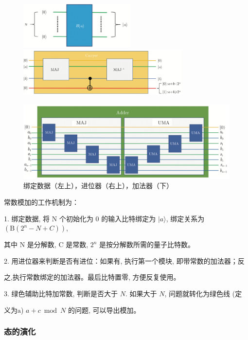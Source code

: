 \documentclass[12pt,hyperref,a4paper,UTF8]{ctexart}
\begin{document}
\begin{figure}[!htbp]
	\begin{minipage}{0.4\linewidth}
		\centering
		\includegraphics[width=2.3in]{figures/绑定数据.png}
	\end{minipage}
	\begin{minipage}{0.6\linewidth}
		\centering
		\includegraphics[width=3.4in]{figures/进位器.png}
	\end{minipage}
\end{figure}
\vskip -18pt
\begin{figure}[!htbp]     
    \centering     
    \includegraphics[width =0.6 \textwidth]{figures/加法器.png}     
    \caption{绑定数据（左上），进位器（右上），加法器（下）}
\end{figure}
\newpage

\noindent
常数模加的工作机制为：

\vskip 3pt
1. 绑定数据, 将 $\mathrm{N}$ 个初始化为 0 的输入比特绑定为 $|a\rangle$, 绑定关系为 $\left(\mathrm{B}\left(2^n-N+C\right)\right)$, 

\quad 其中 $\mathrm{N}$ 是分解数, $\mathrm{C}$ 是常数, $2^n$ 是按分解数所需的量子比特数。

\vskip 3pt
2. 用进位器来判断是否有进位：如果有, 执行第一个模块, 即带常数的加法器；反

\quad 之,执行常数绑定的加法器。最后比特置零, 方便反复使用。

\vskip 3pt
3. 绿色辅助比特加常数, 判断是否大于 $N$. 如果大于 $N$, 问题就转化为绿色线 (定

\quad 义为$\mathrm{a}$) $a+c \bmod N$ 的问题, 可以导出模加。

\subsubsection{态的演化}
\end{document}
